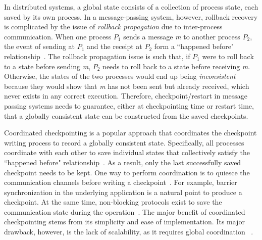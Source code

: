 In distributed systems, a global state consists of a collection of process state, each saved by its own process. In a message-passing system, however, rollback recovery is complicated by the issue of \textit{rollback propagation} due to inter-process communication. When one process $P_1$ sends a message \textit{m} to another process $P_2$, the event of sending at $P_1$ and the receipt at $P_2$ form a ``happened before" relationship~\cite{lamport_comm_1978}. The rollback propagation issue is such that, if $P_1$ were to roll back to a state before sending \textit{m}, $P_2$ needs to roll back to a state before receiving \textit{m}. Otherwise, the states of the two processes would end up being \textit{inconsistent} because they would show that \textit{m} has not been sent but already received, which never exists in any correct execution. Therefore, checkpoint/restart in message passing systems needs to guarantee, either at checkpointing time or restart time, that a globally consistent state can be constructed from the saved checkpoints. %

Coordinated checkpointing is a popular approach that coordinates the checkpoint writing process to record a globally consistent state.
Specifically, all processes
coordinate with each other to save individual states that collectively satisfy the ``happened before" relationship~\cite{chandy_trans_1985}.
As a result, only the last successfully saved checkpoint needs to be kept.
One way to perform coordination is to quiesce the communication channels before writing a checkpoint~\cite{tamir1984error,hargrove2006berkeley}. For example, barrier synchronization in the underlying application is a natural point to produce a checkpoint. At the same time, non-blocking protocols exist to save the communication state during the operation~\cite{coti2006blocking,chandy_trans_1985,lai1987distributed}.
The major benefit of coordinated checkpointing stems from its simplicity and ease of implementation. 
Its major drawback, however, is the lack of scalability, as it requires global coordination
~\cite{elnozahy_dsc_2004,riesen_sandia_2010,hargrove2006berkeley}.


